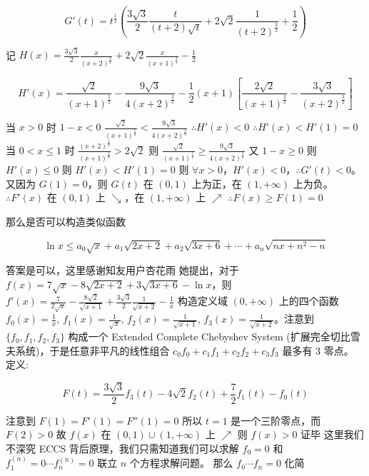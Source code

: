 \documentclass[12pt]{article}
\theoremstyle{definition}
\theoremstyle{plain}
\theoremstyle{definition}
\begin{document}
\[G'(t) = t^{\frac{1}{2}}\left( \frac{3\sqrt{3}}{2}\frac{t}{(t + 2)\sqrt{t}} + 2\sqrt{2}\frac{1}{(t + 2)^{\frac{3}{2}}} + \frac{1}{2} \right)\]

记
\(H(x) = \frac{3\sqrt{3}}{2}\frac{x}{(x + 2)^{\frac{3}{2}}} + 2\sqrt{2}\frac{x}{(x + 1)^{\frac{3}{2}}} - \frac{1}{2}\)

\[H'(x) = \frac{\sqrt{2}}{(x + 1)^{\frac{5}{2}}} - \frac{9\sqrt{3}}{4(x + 2)^{\frac{3}{2}}} - \frac{1}{2}(x + 1)\left\lbrack \frac{2\sqrt{2}}{(x + 1)^{\frac{3}{2}}} - \frac{3\sqrt{3}}{(x + 2)^{\frac{3}{2}}} \right\rbrack\]

当 \(x > 0\) 时 \(1 - x < 0\)
\(\frac{\sqrt{2}}{(x + 1)^{\frac{5}{2}}} < \frac{9\sqrt{3}}{4(x + 2)^{\frac{3}{2}}}\)
\(\therefore H'(x) < 0\) \(\therefore H'(x) < H'(1) = 0\) 当
\(0 < x \leq 1\) 时
\(\frac{(x + 2)^{\frac{2}{3}}}{(x + 1)^{\frac{2}{3}}} > 2\sqrt{2}\) 则
\(\frac{\sqrt{2}}{(x + 1)^{\frac{5}{2}}} \geq \frac{9\sqrt{3}}{4(x + 2)^{\frac{3}{2}}}\)
又 \(1 - x \geq 0\) 则 \(H'(x) \leq 0\) 则 \(H'(x) < H'(1) = 0\) 则
\(\forall x > 0\)，\(H'(x) < 0\)，\(\therefore G'(t) < 0\)。
又因为 \(G(1) = 0\)，则 \(G(t)\) 在 \((0,1)\) 上为正，在
\((1, +\infty)\) 上为负。\(\therefore F'(x)\) 在 \((0,1)\) 上
\(\searrow\)，在 \((1, +\infty)\) 上 \(\nearrow\)
\(\therefore F(x) \geq F(1) = 0\)

那么是否可以构造类似函数

\[\ln x \leq a_{0}\sqrt{x} + a_{1}\sqrt{2x + 2} + a_{2}\sqrt{3x + 6} + \cdots + a_{n}\sqrt{nx + n^{2} - n}\]

答案是可以，这里感谢知友用户杏花雨 她提出，对于
\(f(x) = 7\sqrt{x} - 8\sqrt{2x + 2} + 3\sqrt{3x + 6} - \ln x\)，则
\(f'(x) = \frac{7}{2\sqrt{x}} - \frac{8\sqrt{2}}{\sqrt{x + 1}} + \frac{3\sqrt{3}}{2}\frac{1}{\sqrt{x + 2}} - \frac{1}{x}\)
构造定义域 \((0, + \infty)\) 上的四个函数 \(f_{0}(x) = \frac{1}{x}\),
\(f_{1}(x) = \frac{1}{\sqrt{x}}\),
\(f_{2}(x) = \frac{1}{\sqrt{x + 1}}\),
\(f_{3}(x) = \frac{1}{\sqrt{x + 2}}\)。注意到
\(\{ f_{0},f_{1},f_{2},f_{3}\}\) 构成一个 Extended Complete Chebyshev
System (扩展完全切比雪夫系统)，于是任意非平凡的线性组合
\(c_{0}f_{0} + c_{1}f_{1} + c_{2}f_{2} + c_{3}f_{3}\) 最多有 3 零点。
定义:

\[F(t) = \frac{3\sqrt{3}}{2}f_{3}(t) - 4\sqrt{2}f_{2}(t) + \frac{7}{2}f_{1}(t) - f_{0}(t)\]

注意到 \(F(1) = F'(1) = F''(1) = 0\) 所以 \(t = 1\) 是一个三阶零点，而
\(F(2) > 0\) 故 \(f(x)\) 在 \((0,1) \cup (1, + \infty)\) 上 \(\nearrow\)
则 \(f(x) > 0\) 证毕 这里我们不深究 ECCS
背后原理，我们只需知道我们可以求解 \(f_{0} = 0\) 和
\(f_{1}^{(n)} = 0\cdots f_{n}^{(n)} = 0\) 联立 \(n\) 个方程求解问题。
那么 \(f_{0}\cdots f_{n} = 0\) 化简
\end{document}
